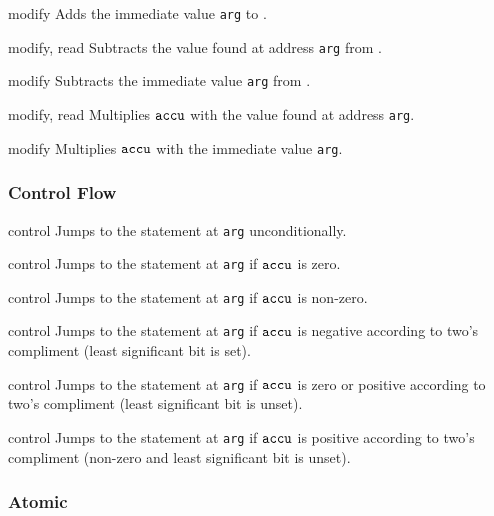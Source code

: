 {}
{modify}
{Adds the immediate value \texttt{arg} to \ACCU.}

{}
{modify, read}
{Subtracts the value found at address \texttt{arg} from \ACCU.}

{}
{modify}
{Subtracts the immediate value \texttt{arg} from \ACCU.}

{}
{modify, read}
{Multiplies $\texttt{accu}$ with the value found at address \texttt{arg}.}

{}
{modify}
{Multiplies $\texttt{accu}$ with the immediate value \texttt{arg}.}


\subsubsection*{Control Flow}


{}
{control}
{Jumps to the statement at \texttt{arg} unconditionally.}

{}
{control}
{Jumps to the statement at \texttt{arg} if $\texttt{accu}$ is zero.}

{}
{control}
{Jumps to the statement at \texttt{arg} if $\texttt{accu}$ is non-zero.}

{}
{control}
{Jumps to the statement at \texttt{arg} if $\texttt{accu}$ is negative according to two's compliment (least significant bit is set).}

{}
{control}
{Jumps to the statement at \texttt{arg} if $\texttt{accu}$ is zero or positive according to two's compliment (least significant bit is unset).}

{}
{control}
{Jumps to the statement at \texttt{arg} if $\texttt{accu}$ is positive according to two's compliment (non-zero and least significant bit is unset).}

\subsubsection*{Atomic}


